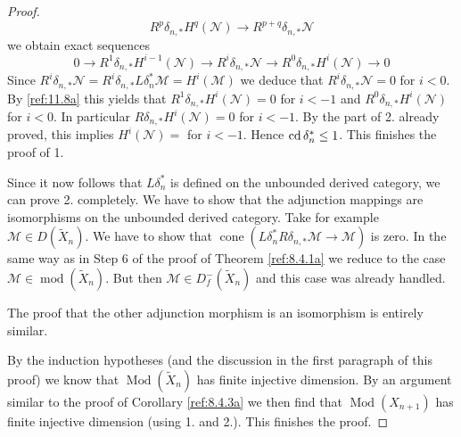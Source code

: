 \documentclass{amsproc}
\def\Mscr{{\mathcal M}}
\def\Nscr{{\mathcal N}}
\DeclareMathOperator{\cone}{cone}
\def\cd{\mathop{\text{cd}}}
\def\coh{\operatorname {mod}}
\def\Qch{\operatorname {Mod}}
\def\r{\rightarrow}
\let\oldtext\text
\def\text#1{\oldtext{\upshape #1}}
\theoremstyle{definition}
\theoremstyle{remark}
\numberwithin{equation}{section}
\numberwithin{table}{section}
\numberwithin{figure}{section}
\begin{document}
\begin{proof}
\[
R^p\delta_{n,\ast} H^q(\Nscr)\r  R^{p+q}\delta_{n,\ast} \Nscr
\]
we obtain exact sequences
\begin{equation}
\label{ref:11.8a}
0\r R^1\delta_{n,\ast} H^{i-1}(\Nscr)\r R^i\delta_{n,\ast}\Nscr \r
R^0\delta_{n,\ast} H^i(\Nscr)\r 0
\end{equation}
Since
$R^i\delta_{n,\ast}\Nscr=R^i\delta_{n,\ast}L\delta^\ast_n\Mscr=H^i(\Mscr)$
we deduce that $R^i\delta_{n,\ast}\Nscr=0$ for $i<0$. By
\eqref{ref:11.8a} this yields that $R^1\delta_{n,\ast} H^{i}(\Nscr)=0$ for
$i<-1$ and $R^0\delta_{n,\ast} H^i(\Nscr)$ for $i<0$. In particular
$R\delta_{n,\ast} H^i(\Nscr)=0$ for $ i<-1$. By the part of 2. already
proved, this implies $H^i(\Nscr)=$ for $i<-1$. Hence $\cd
\delta^\ast_n\le 1$. This finishes the proof of 1.



 
Since it now follows that $L\delta^\ast_n$ is defined on the unbounded
derived category, we can  prove 2. completely. We have to show that
the adjunction mappings are isomorphisms on the unbounded derived
category. Take for example $\Mscr\in D(\tilde{X}_n)$.  We have to show
that $\cone(L\delta^\ast_n R\delta_{n,\ast} \Mscr\r \Mscr)$ is zero. In
the same way as in Step 6 of the proof of Theorem \ref{ref:8.4.1a}
we reduce to the case $\Mscr\in \coh(\tilde{X}_n)$. But then $\Mscr\in
D^-_f(\tilde{X}_n)$ and this case was already handled.


The proof that the other adjunction morphism is an isomorphism is
entirely similar.

By the induction hypotheses (and the discussion in the first paragraph
of this proof) we know that $\Qch(\tilde{X}_n)$ has finite injective
dimension. By an argument similar to the proof of
  Corollary
\ref{ref:8.4.3a} we then find that  $\Qch({X}_{n+1})$ has
finite injective dimension (using 1. and 2.).
 This finishes the proof.
\end{proof}
\end{document}

